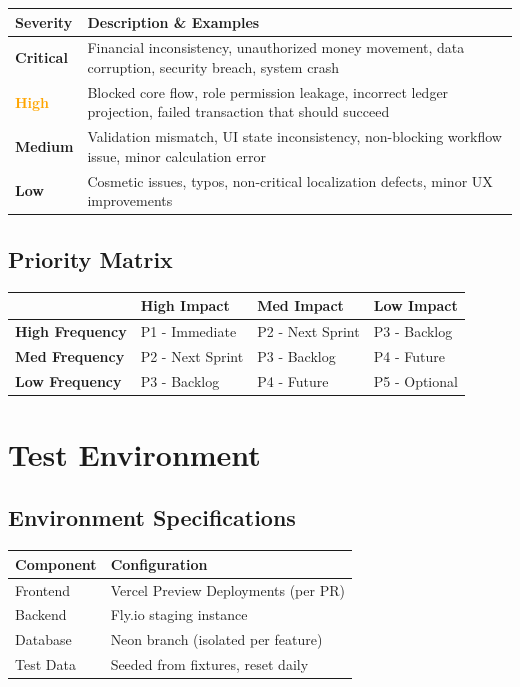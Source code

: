 \documentclass[11pt,a4paper]{article}
\newcommand{\critical}{\textcolor{accentred}{\textbf{Critical}}}
\newcommand{\highsev}{\textcolor{orange}{\textbf{High}}}
\newcommand{\mediumsev}{\textcolor{primaryblue}{\textbf{Medium}}}
\newcommand{\lowsev}{\textcolor{accentgreen}{\textbf{Low}}}
\begin{document}
\begin{tabular}{@{}p{2cm}p{11cm}@{}}
\toprule
\textbf{Severity} & \textbf{Description \& Examples} \\
\midrule
\critical & Financial inconsistency, unauthorized money movement, data corruption, security breach, system crash \\
\addlinespace
\highsev & Blocked core flow, role permission leakage, incorrect ledger projection, failed transaction that should succeed \\
\addlinespace
\mediumsev & Validation mismatch, UI state inconsistency, non-blocking workflow issue, minor calculation error \\
\addlinespace
\lowsev & Cosmetic issues, typos, non-critical localization defects, minor UX improvements \\
\bottomrule
\end{tabular}

\subsection{Priority Matrix}

\begin{tabular}{@{}p{3cm}p{3cm}p{3cm}p{3cm}@{}}
\toprule
& \textbf{High Impact} & \textbf{Med Impact} & \textbf{Low Impact} \\
\midrule
\textbf{High Frequency} & P1 - Immediate & P2 - Next Sprint & P3 - Backlog \\
\textbf{Med Frequency} & P2 - Next Sprint & P3 - Backlog & P4 - Future \\
\textbf{Low Frequency} & P3 - Backlog & P4 - Future & P5 - Optional \\
\bottomrule
\end{tabular}

\section{Test Environment}

\subsection{Environment Specifications}

\begin{tabular}{@{}p{4cm}p{9cm}@{}}
\toprule
\textbf{Component} & \textbf{Configuration} \\
\midrule
Frontend & Vercel Preview Deployments (per PR) \\
Backend & Fly.io staging instance \\
Database & Neon branch (isolated per feature) \\
Test Data & Seeded from fixtures, reset daily \\
\bottomrule
\end{tabular}
\end{document}
